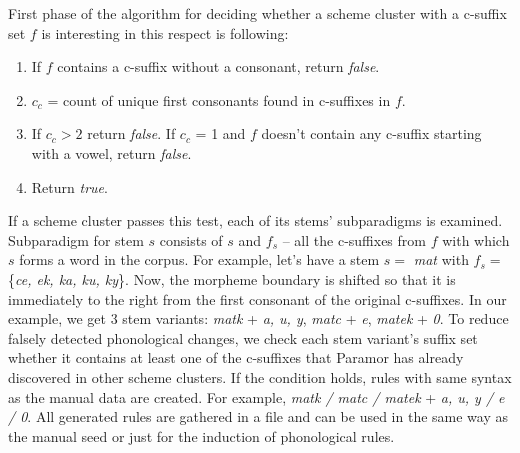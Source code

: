 \documentclass[11pt]{article}
\begin{document}
First phase of the algorithm for deciding whether a scheme cluster with a c-suffix set $f$ is interesting in this respect is following:
\begin{enumerate}
\item If $f$ contains a c-suffix without a consonant, return \emph{false}.
\item $c_c$ = count of unique first consonants found in c-suffixes in $f$.
\item If $c_c > 2$ return \emph{false}. If $c_c$ = 1 and $f$ doesn't contain any c-suffix starting with a vowel, return \emph{false}.
\item Return \emph{true}.
\end{enumerate}
If a scheme cluster passes this test, each of its stems' subparadigms is examined. Subparadigm for stem $s$ consists of $s$ and $f_s$ -- all the c-suffixes from $f$ with which $s$ forms a word in the corpus. For example, let's have a stem $s = $ \emph{mat} with $f_s = $ \{\emph{ce, ek, ka, ku, ky}\}. Now, the morpheme boundary is shifted so that it is immediately to the right from the first consonant of the original c-suffixes. In our example, we get 3 stem variants: \emph{matk} + \emph{a, u, y}, \emph{matc} + \emph{e}, \emph{matek} + \emph{0}. To reduce falsely detected phonological changes, we check each stem variant's suffix set whether it contains at least one of the c-suffixes that Paramor has already discovered in other scheme clusters. If the condition holds, rules with same syntax as the manual data are created. For example, \emph{matk / matc / matek} + \emph{a, u, y / e / 0}. All generated rules are gathered in a file and can be used in the same way as the manual seed or just for the induction of phonological rules.
\end{document}
